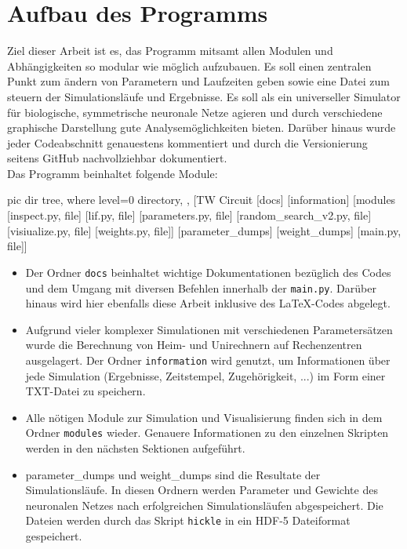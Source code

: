 \section{Aufbau des Programms}
\label{sec:imp_module}
	Ziel dieser Arbeit ist es, das Programm mitsamt allen Modulen und Abhängigkeiten so modular wie möglich aufzubauen. Es soll einen zentralen Punkt zum ändern von Parametern und Laufzeiten geben sowie eine Datei zum steuern der Simulationsläufe und Ergebnisse. Es soll als ein universeller Simulator für biologische, symmetrische neuronale Netze agieren und durch verschiedene graphische Darstellung gute Analysemöglichkeiten bieten. Darüber hinaus wurde jeder Codeabschnitt genauestens kommentiert und durch die Versionierung seitens GitHub nachvollziehbar dokumentiert.\\
	Das Programm beinhaltet folgende Module:\\
	\begin{minipage}{0.35\textwidth}
		\vspace{0.3cm}
		\begin{forest}
			pic dir tree,
			where level=0{}{%
				directory,
			},
			[TW Circuit
				[docs]
				[information]
				[modules
					[inspect.py, file]
					[lif.py, file]
					[parameters.py, file]
					[random\_search\_v2.py, file]
					[visiualize.py, file]
					[weights.py, file]]
				[parameter\_dumps]
				[weight\_dumps]
				[main.py, file]]
		\end{forest}
	\end{minipage}
	\begin{minipage}{0.65\textwidth}
		\begin{itemize}
			\item Der Ordner \texttt{docs} beinhaltet wichtige Dokumentationen bezüglich des Codes und dem Umgang mit diversen Befehlen innerhalb der \texttt{main.py}. Darüber hinaus wird hier ebenfalls diese Arbeit inklusive des \LaTeX-Codes abgelegt.
			\item Aufgrund vieler komplexer Simulationen mit verschiedenen Parametersätzen wurde die Berechnung von Heim- und Unirechnern auf Rechenzentren ausgelagert. Der Ordner \texttt{information} wird genutzt, um Informationen über jede Simulation (Ergebnisse, Zeitstempel, Zugehörigkeit, ...) im Form einer TXT-Datei zu speichern.
			\item Alle nötigen Module zur Simulation und Visualisierung finden sich in dem Ordner \texttt{modules} wieder. Genauere Informationen zu den einzelnen Skripten werden in den nächsten Sektionen aufgeführt.
			\item parameter\_dumps und weight\_dumps sind die Resultate der Simulationsläufe. In diesen Ordnern werden Parameter und Gewichte des neuronalen Netzes nach erfolgreichen Simulationsläufen abgespeichert. Die Dateien werden durch das Skript \texttt{hickle} in ein HDF-5 Dateiformat gespeichert.
		\end{itemize}		
	\end{minipage}
	
